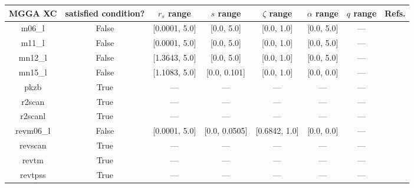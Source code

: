 \begin{tabular}{|c|c|c|c|c|c|c|l|}
\hline
  MGGA XC &  satisfied condition? &   $r_s$ range &     $s$ range & $\zeta$ range & $\alpha$ range & $q$ range  &                                                     Refs. \\ \hline
   m06\_l &                 False & [0.0001, 5.0] &    [0.0, 5.0] &    [0.0, 1.0] &     [0.0, 5.0] &        --- &                       \cite{Zhao2006_194101,Zhao2008_215} \\ \hline
   m11\_l &                 False & [0.0001, 5.0] &    [0.0, 5.0] &    [0.0, 1.0] &     [0.0, 5.0] &        --- &                                   \cite{Peverati2012_117} \\ \hline
  mn12\_l &                 False & [1.3643, 5.0] &    [0.0, 5.0] &    [0.0, 1.0] &     [0.0, 5.0] &        --- &                                 \cite{Peverati2012_13171} \\ \hline
  mn15\_l &                 False & [1.1083, 5.0] &  [0.0, 0.101] &    [0.0, 1.0] &     [0.0, 0.0] &        --- &                                        \cite{Yu2016_1280} \\ \hline
     pkzb &                  True &           --- &           --- &           --- &            --- &        --- &                                    \cite{Perdew1999_2544} \\ \hline
   r2scan &                  True &           --- &           --- &           --- &            --- &        --- &                  \cite{Furness2020_8208,Furness2020_9248} \\ \hline
  r2scanl &                  True &           --- &           --- &           --- &            --- &        --- & \cite{Mejia2020_121109,Furness2020_8208,Furness2020_9248} \\ \hline
revm06\_l &                 False & [0.0001, 5.0] & [0.0, 0.0505] & [0.6842, 1.0] &     [0.0, 0.0] &        --- &                                      \cite{Wang2017_8487} \\ \hline
  revscan &                  True &           --- &           --- &           --- &            --- &        --- &                                     \cite{Mezei2018_2469} \\ \hline
    revtm &                  True &           --- &           --- &           --- &            --- &        --- &                                      \cite{Jana2019_6356} \\ \hline
  revtpss &                  True &           --- &           --- &           --- &            --- &        --- &            \cite{Perdew2009_026403,Perdew2009_026403_err} \\ \hline

\end{tabular}
